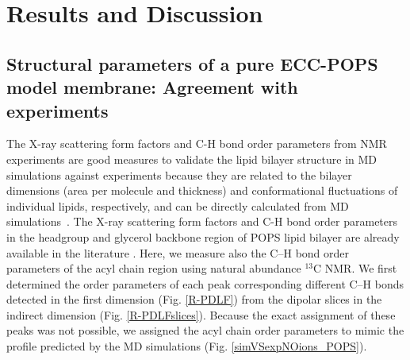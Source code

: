 \documentclass[journal=jpcbfk,manuscript=article]{achemso}
\begin{document}

\section{Results and Discussion} 
 
\subsection{Structural parameters of a pure ECC-POPS model membrane: Agreement with experiments} 
 
The X-ray scattering form factors and C-H bond order parameters from NMR experiments are good measures to validate
the lipid bilayer structure in MD simulations against experiments because they
are related to the bilayer dimensions (area per molecule and thickness) and
conformational fluctuations of individual lipids, respectively, and 
can be directly calculated from MD simulations~\cite{ollila16}.
The X-ray scattering form factors and C-H bond order parameters in
the headgroup and glycerol backbone region of POPS lipid bilayer are already available in the literature \cite{kucerka14,NMRlipidsIV}.
Here, we measure also the C--H bond order parameters of the acyl chain region using natural abundance $^{13}$C NMR.
We first determined the order parameters of each peak corresponding different C--H bonds detected
in the first dimension (Fig. \ref{R-PDLF}) from the dipolar slices in the indirect dimension (Fig. \ref{R-PDLFslices}).
Because the exact assignment of these peaks was not possible, we assigned the
acyl chain order parameters to mimic the profile predicted by the MD simulations (Fig. \ref{simVSexpNOions_POPS}).
\end{document}
